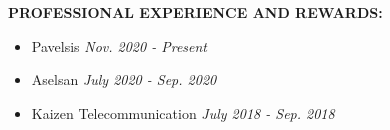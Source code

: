 \textbf{PROFESSIONAL EXPERIENCE AND REWARDS:}
\vspace{-3mm}
\begin{itemize}
  \item Pavelsis \hfill \textit{Nov. 2020 - Present}
  \item Aselsan \hfill \textit{July 2020 - Sep. 2020}
  \item Kaizen Telecommunication \hfill \textit{July 2018 - Sep. 2018}
\end{itemize}


\vspace{-3mm}
